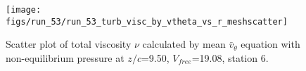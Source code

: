\begin{figure}[H]
\centering
\texttt{[image: figs/run\_53/run\_53\_turb\_visc\_by\_vtheta\_vs\_r\_meshscatter]}
\caption{Scatter plot of total viscosity $\nu$ calculated by mean $\bar{v}_{\theta}$ equation with non-equilibrium pressure at $z/c$=9.50, $V_{free}$=19.08, station 6.}
\label{fig:run_53_turb_visc_by_vtheta_vs_r_meshscatter}
\end{figure}


